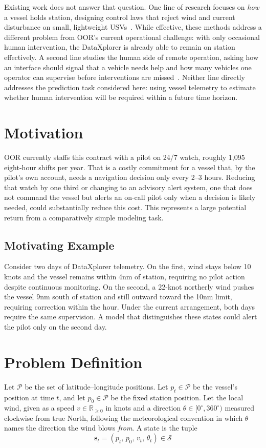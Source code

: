\documentclass[sigconf]{acmart}
\begin{document}
{Existing work does not answer that question. One line of research focuses on
\textit{how} a vessel holds station, designing control laws that reject wind and
current disturbance on small, lightweight USVs~\cite{sarda2016station}. While effective, these methods address a different problem from OOR's current operational challenge: with only occasional human intervention, the DataXplorer is already able to remain on station effectively. A second line studies the human side of remote operation, asking how an interface should signal that a vehicle needs help and how many vehicles one operator can supervise before interventions are missed~\cite{bogg2026alert}. Neither line directly addresses the prediction task considered here: using vessel telemetry to estimate whether human intervention will be required within a future time horizon.}


\section{Motivation}
{OOR currently staffs this contract with a pilot on 24/7 watch, roughly 1,095 eight-hour shifts per year.  That is a costly commitment for a vessel that, by the pilot's own account, needs a navigation decision only every 2–3 hours.  Reducing that watch by one third or changing to an advisory alert system, one that does not command the vessel but alerts an on-call pilot only when a decision is likely needed, could substantially reduce this cost.  This represents a large potential return from a comparatively simple modeling task.}


\subsection{Motivating Example}
{Consider two days of DataXplorer telemetry. On the first, wind stays below 10 knots and the vessel remains within 4nm of station, requiring no pilot action despite continuous monitoring. On the second, a 22-knot northerly wind pushes the vessel 9nm south of station and still outward toward the 10nm limit, requiring correction within the hour. Under the current arrangement, both days require the same supervision. A model that distinguishes these states could alert the pilot only on the second day.}


\section{Problem Definition}
Let $\mathcal{P}$ be the set of latitude--longitude positions. Let
$p_t \in \mathcal{P}$ be the vessel's position at time $t$, and let
$p_0 \in \mathcal{P}$ be the fixed station position.  Let the local wind, given as a speed $v \in \mathbb{R}_{\ge 0}$ in knots and a direction
$\theta \in [0^\circ, 360^\circ)$ measured clockwise from true North, following
the meteorological convention in which $\theta$ names the direction the wind
blows \textit{from}. A state is the tuple
\begin{equation}
  \mathbf{s}_t = (p_t,\,p_0,\,v_t,\,\theta_t) \in \mathcal{S}
\end{equation}
\end{document}
